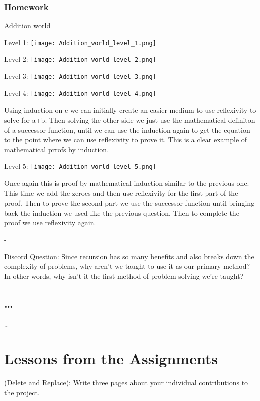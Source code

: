 \documentclass{article}
\theoremstyle{theorem}
\theoremstyle{definition}
\theoremstyle{remark}
\begin{document}
\subsubsection*{Homework}

Addition world

Level 1: 
\texttt{[image: Addition\_world\_level\_1.png]}

Level 2: 
\texttt{[image: Addition\_world\_level\_2.png]}

Level 3:
\texttt{[image: Addition\_world\_level\_3.png]}

Level 4:
\texttt{[image: Addition\_world\_level\_4.png]}

Using induction on c we can initially create an easier medium to use reflexivity to solve for a+b. Then solving the other side we just use the mathematical definiton of a successor function, until we can use the induction again to get the equation to the point where we can use reflexivity to prove it. This is a clear example of mathematical prrofs by induction.

Level 5:
\texttt{[image: Addition\_world\_level\_5.png]}

Once again this is proof by mathematical induction similar to the previous one. This time we add the zeroes and then use reflexivity for the first part of the proof. Then to prove the second part we use the successor function until bringing back the induction we used like the previous question. Then to complete the proof we use reflexivity again. 

-

Discord Question: Since recursion has so many benefits and also breaks down the complexity of problems, why aren't we taught to use it as our primary method? In other words, why isn't it the first method of problem solving we're taught?

\subsection{\ldots}

\ldots

\section{Lessons from the Assignments}

(Delete and Replace): Write three pages about your individual contributions to the project.
\end{document}
